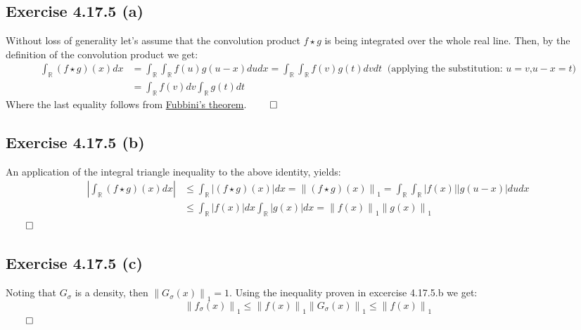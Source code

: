 \documentclass{exam}
\renewenvironment{proof}{{\noindent\itshape\ignorespaces}}{{\hfill$\qed$\\}}
\begin{document}
\subsection*{Exercise 4.17.5 (a)}
\begin{proof}
    Without loss of generality let's assume that the convolution product $f \star g$ is being integrated over the whole real line. Then, by the definition of the 
    convolution product we get:\\
    \begin{equation*}
        \begin{aligned}
            \int_{\mathbb{R}} (f \star g) (x) d x  &= \displaystyle \int_{\mathbb{R}} \int_{\mathbb{R}} f(u) g(u-x) du dx = \displaystyle \int_{\mathbb{R}} \int_{\mathbb{R}} f(v) g(t) dv dt   \ \text{ (applying the substitution: } u = v \text{,}  u- x = t \text{)}\\
            &= \int_{\mathbb{R}} f(v) d v \displaystyle \int_{\mathbb{R}} g(t) dt
        \end{aligned}    
    \end{equation*}
\noindent Where the last equality follows from \href{https://en.wikipedia.org/wiki/Fubini%27s_theorem}{Fubbini's theorem}.
\end{proof}

\subsection*{Exercise 4.17.5 (b)}
\begin{proof}
    An application of the integral triangle inequality to the above identity, yields:
    \begin{equation*}
        \begin{aligned}
        \left| \int_{\mathbb{R}} (f \star g) (x) d x  \right| &\leq \int_{\mathbb{R}} \left|  (f \star g )(x) \right|d x = {\lVert (f\star g )(x) \lVert}_{1} = \int_{\mathbb{R}} \int_{\mathbb{R}} \left|  f (x) \right| \left|  g(u-x) \right| du dx \\
        &\leq \int_{\mathbb{R}} \left|  f (x) \right| d x  \int_{\mathbb{R}} \left|  g (x) \right| d x =  {\lVert f(x) \lVert}_{1}{\lVert g(x) \lVert}_{1}
        \end{aligned}    
    \end{equation*} 
\end{proof}
\subsection*{Exercise 4.17.5 (c)}
\begin{proof}
    \noindent Noting that $G_{\sigma}$ is a density, then ${\lVert G_{\sigma}(x) \lVert}_{1} = 1$. Using the inequality proven in excercise 4.17.5.b we get:\\
    \begin{equation*}
        {\lVert f_{\sigma}(x) \lVert}_{1} \leq {\lVert f(x) \lVert}_{1}{\lVert G_{\sigma}(x) \lVert}_{1} \leq {\lVert f(x) \lVert}_{1} 
    \end{equation*}
\end{proof}    
\end{document}
